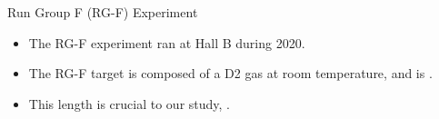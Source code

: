 \begin{frame}{Run Group F (RG-F) Experiment}
    \label{10.41::rgf_experiment}

    \begin{itemize}
        \item
            The RG-F experiment ran at Hall B during 2020.

        \item
            The RG-F target is composed of a D2 gas at room temperature, and is .

        \item
            This length is crucial to our study, .
    \end{itemize}

\end{frame}
